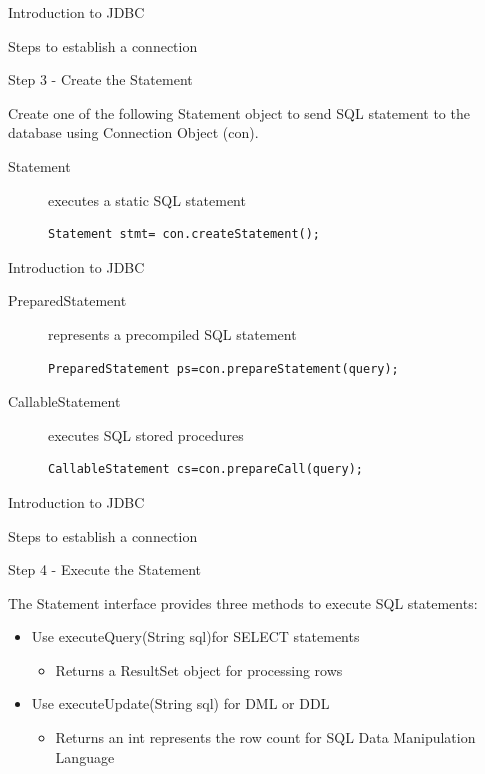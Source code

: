 \documentclass[14pt]{beamer}
\begin{document}
\begin{frame}[fragile]{Introduction to JDBC}
\begin{block}{}
Steps to establish a connection 
\end{block}
\begin{block}{}
Step 3 - Create the Statement
\end{block}
Create one of the following Statement object to send SQL statement to the database using Connection Object (con).
\begin{description}
\item [Statement] executes a static SQL statement
\begin{lstlisting}[numbers=none]
Statement stmt= con.createStatement();
\end{lstlisting}
\end{description}
\end{frame}

\begin{frame}[fragile]{Introduction to JDBC}
\begin{description}
\item [PreparedStatement] represents a precompiled SQL statement
\begin{lstlisting}[numbers=none]
PreparedStatement ps=con.prepareStatement(query);
\end{lstlisting}
\item [CallableStatement] executes SQL stored procedures
\begin{lstlisting}[numbers=none]
CallableStatement cs=con.prepareCall(query);
\end{lstlisting}
\end{description}
\end{frame}


\begin{frame}{Introduction to JDBC}
\begin{block}{}
Steps to establish a connection 
\end{block}
\begin{block}{}
Step 4 - Execute the Statement
\end{block}

The Statement interface provides three methods to execute SQL statements:
\begin{itemize} 
\item Use executeQuery(String sql)for SELECT statements
\begin{itemize} 
\item Returns a ResultSet object for processing rows
\end{itemize}
\item Use executeUpdate(String sql) for DML or DDL
\begin{itemize} 
\item Returns an int  represents the row count for SQL Data Manipulation Language
\end{itemize}
\end{itemize}
\end{frame}
\end{document}
